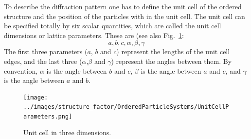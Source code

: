 To describe the diffraction pattern one has to define the unit cell of the ordered structure and the position of the particles with in the unit cell. The unit cell can be specified totally by six scalar quantities, which are called the unit cell dimensions or lattice parameters. These are (see also Fig.\ \ref{fig:UnitCellDimensions}:
$$ a,b,c,\alpha,\beta,\gamma $$
The first three parameters ($a$, $b$ and $c$) represent the lengths of the unit cell edges,
and the last three ($\alpha$,$\beta$ and $\gamma$) represent the angles between them. By convention, $\alpha$ is the angle between $b$ and $c$, $\beta$ is the angle between $a$ and $c$, and $\gamma$ is the angle between $a$ and $b$.
\begin{figure}[htb]
\begin{center}
\texttt{[image: ../images/structure\_factor/OrderedParticleSystems/UnitCellParameters.png]}
\end{center}
\caption{Unit cell in three dimensions. } \label{fig:UnitCellDimensions}
\end{figure}

